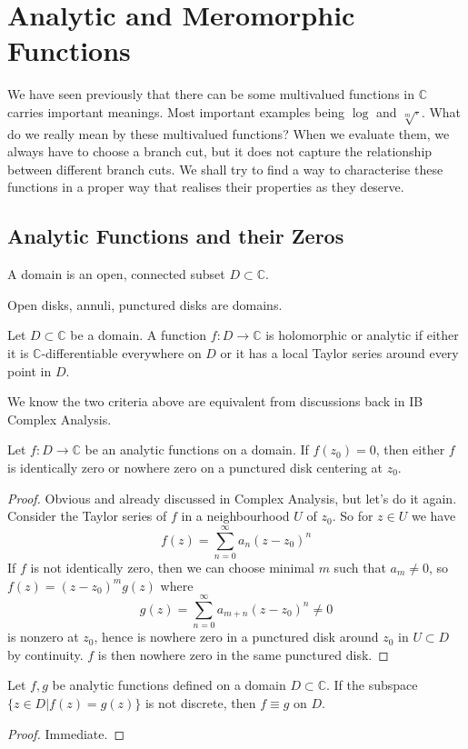 \section{Analytic and Meromorphic Functions}
We have seen previously that there can be some multivalued functions in $\mathbb C$ carries important meanings.
Most important examples being $\log$ and $\sqrt[m]{\cdot}$.
What do we really mean by these multivalued functions?
When we evaluate them, we always have to choose a branch cut, but it does not capture the relationship between different branch cuts.
We shall try to find a way to characterise these functions in a proper way that realises their properties as they deserve.
\subsection{Analytic Functions and their Zeros}
\begin{definition}
    A domain is an open, connected subset $D\subset\mathbb C$.
\end{definition}
\begin{example}
    Open disks, annuli, punctured disks are domains.
\end{example}
\begin{definition}
    Let $D\subset\mathbb C$ be a domain.
    A function $f:D\to\mathbb C$ is holomorphic or analytic if either it is $\mathbb C$-differentiable everywhere on $D$ or it has a local Taylor series around every point in $D$.
\end{definition}
We know the two criteria above are equivalent from discussions back in IB Complex Analysis.
\begin{proposition}
    Let $f:D\to\mathbb C$ be an analytic functions on a domain.
    If $f(z_0)=0$, then either $f$ is identically zero or nowhere zero on a punctured disk centering at $z_0$.
\end{proposition}
\begin{proof}
    Obvious and already discussed in Complex Analysis, but let's do it again.
    Consider the Taylor series of $f$ in a neighbourhood $U$ of $z_0$.
    So for $z\in U$ we have
    $$f(z)=\sum_{n=0}^\infty a_n(z-z_0)^n$$
    If $f$ is not identically zero, then we can choose minimal $m$ such that $a_m\neq 0$, so $f(z)=(z-z_0)^mg(z)$ where
    $$g(z)=\sum_{n=0}^\infty a_{m+n}(z-z_0)^n\neq 0$$
    is nonzero at $z_0$, hence is nowhere zero in a punctured disk around $z_0$ in $U\subset D$ by continuity.
    $f$ is then nowhere zero in the same punctured disk.
\end{proof}
\begin{corollary}
    Let $f,g$ be analytic functions defined on a domain $D\subset\mathbb C$.
    If the subspace $\{z\in D|f(z)=g(z)\}$ is not discrete, then $f\equiv g$ on $D$.
\end{corollary}
\begin{proof}
    Immediate.
\end{proof}
